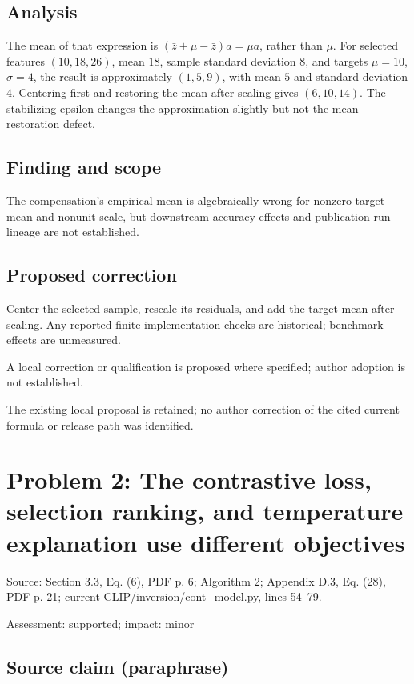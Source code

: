 \documentclass[11pt]{article}
\begin{document}
\subsection*{Analysis}

The mean of that expression is \((\bar z+\mu-\bar z)a=\mu a\), rather than \(\mu\). For selected features \((10,18,26)\), mean \(18\), sample standard deviation \(8\), and targets \(\mu=10\), \(\sigma=4\), the result is approximately \((1,5,9)\), with mean \(5\) and standard deviation \(4\). Centering first and restoring the mean after scaling gives \((6,10,14)\). The stabilizing epsilon changes the approximation slightly but not the mean-restoration defect.

\subsection*{Finding and scope}

The compensation’s empirical mean is algebraically wrong for nonzero target mean and nonunit scale, but downstream accuracy effects and publication-run lineage are not established.

\subsection*{Proposed correction}

Center the selected sample, rescale its residuals, and add the target mean after scaling. Any reported finite implementation checks are historical; benchmark effects are unmeasured.

A local correction or qualification is proposed where specified; author adoption is not established.

The existing local proposal is retained; no author correction of the cited current formula or release path was identified.

\section*{Problem 2: The contrastive loss, selection ranking, and temperature explanation use different objectives}

Source: Section 3.3, Eq. (6), PDF p. 6; Algorithm 2; Appendix D.3, Eq. (28), PDF p. 21; current CLIP/inversion/cont\_model.py, lines 54–79.

Assessment: supported; impact: minor

\subsection*{Source claim (paraphrase)}
\end{document}
